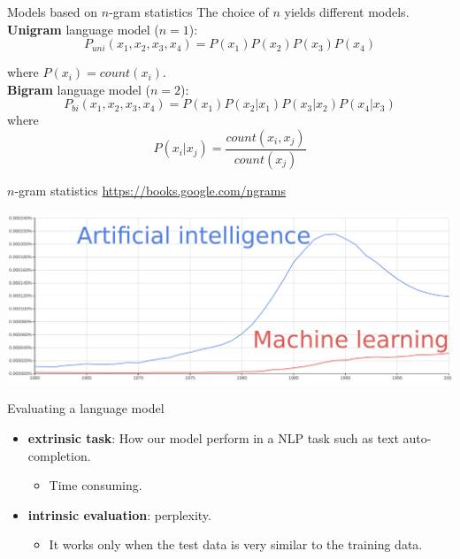 \documentclass[10pt]{beamer}
\begin{document}
\begin{frame}{Models based on $n$-gram statistics}
The choice of $n$ yields different models.\\

\textbf{Unigram} language model ($n=1$): 
\begin{equation*}
P_{uni}(x_1, x_2, x_3, x_4) = P(x_1)P(x_2)P(x_3)P(x_4)
\end{equation*}

where $P(x_i) = count(x_i)$.\\

\textbf{Bigram} language model ($n=2$): 
\begin{equation*}
P_{bi}(x_1,x_2,x_3,x_4) = P(x_1)P(x_2\vert x_1)P(x_3\vert x_2)P(x_4\vert x_3)
\end{equation*}	
where
\[
P(x_i\vert x_j) = \frac{count(x_i, x_j)}{count(x_j)}
\]
\end{frame}

\begin{frame}{$n$-gram statistics}
\url{https://books.google.com/ngrams}
\vspace{0.4cm}

\includegraphics[scale=0.14]{images/AI_ML.png}
\end{frame}



\begin{frame}{Evaluating a language model}

\begin{itemize}
\item \textbf{extrinsic task}: How our model perform in a NLP task such as text auto-completion.
\begin{itemize}
\item Time consuming.
\end{itemize}
\vspace{0.5cm}
\item \textbf{intrinsic evaluation}: perplexity.
\begin{itemize}
\item It works only when the test data is very similar to the training data.
\end{itemize}
\end{itemize}
\end{frame}
\end{document}
